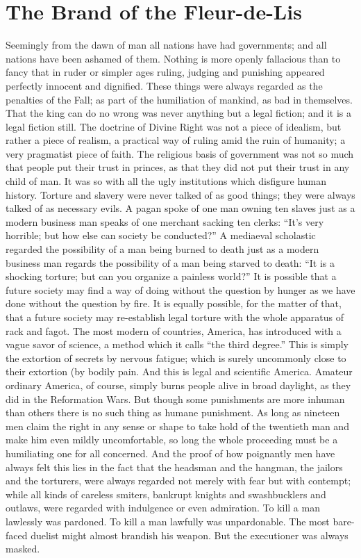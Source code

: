 \documentclass{book}
\begin{document}
\chapter{The Brand of the Fleur-de-Lis}
\label{chapter-26}
Seemingly from the dawn of man all nations have had governments; and all nations have been ashamed of them. Nothing is more openly fallacious than to fancy that in ruder or simpler ages ruling, judging and punishing appeared perfectly innocent and dignified. These things were always regarded as the penalties of the Fall; as part of the humiliation of mankind, as bad in themselves. That the king can do no wrong was never anything but a legal fiction; and it is a legal fiction still. The doctrine of Divine Right was not a piece of idealism, but rather a piece of realism, a practical way of ruling amid the ruin of humanity; a very pragmatist piece of faith. The religious basis of government was not so much that people put their trust in princes, as that they did not put their trust in any child of man. It was so with all the ugly institutions which disfigure human history. Torture and slavery were never talked of as good things; they were always talked of as necessary evils. A pagan spoke of one man owning ten slaves just as a modern business man speaks of one merchant sacking ten clerks: “It’s very horrible; but how else can society be conducted?” A mediaeval scholastic regarded the possibility of a man being burned to death just as a modern business man regards the possibility of a man being starved to death: “It is a shocking torture; but can you organize a painless world?” It is possible that a future society may find a way of doing without the question by hunger as we have done without the question by fire. It is equally possible, for the matter of that, that a future society may re-establish legal torture with the whole apparatus of rack and fagot. The most modern of countries, America, has introduced with a vague savor of science, a method which it calls “the third degree.” This is simply the extortion of secrets by nervous fatigue; which is surely uncommonly close to their extortion (by bodily pain. And this is legal and scientific America. Amateur ordinary America, of course, simply burns people alive in broad daylight, as they did in the Reformation Wars. But though some punishments are more inhuman than others there is no such thing as humane punishment. As long as nineteen men claim the right in any sense or shape to take hold of the twentieth man and make him even mildly uncomfortable, so long the whole proceeding must be a humiliating one for all concerned. And the proof of how poignantly men have always felt this lies in the fact that the headsman and the hangman, the jailors and the torturers, were always regarded not merely with fear but with contempt; while all kinds of careless smiters, bankrupt knights and swashbucklers and outlaws, were regarded with indulgence or even admiration. To kill a man lawlessly was pardoned. To kill a man lawfully was unpardonable. The most bare-faced duelist might almost brandish his weapon. But the executioner was always masked.
\end{document}
